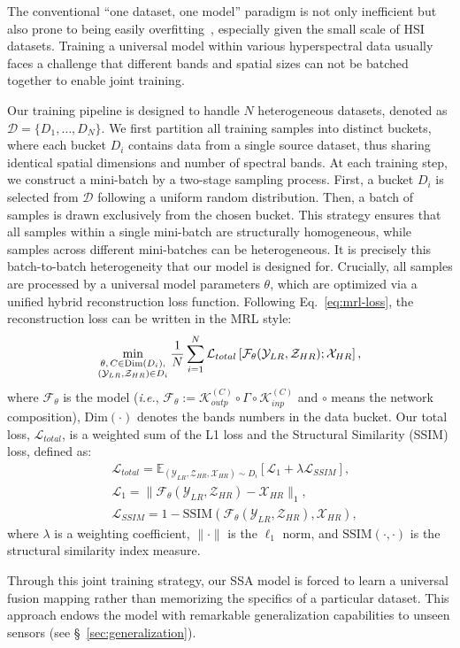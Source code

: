 The conventional ``one dataset, one model'' paradigm is not only inefficient but also prone to being easily overfitting~\cite{yan2025hyperspectral}, especially given the small scale of HSI datasets. Training a universal model within various hyperspectral data usually faces a challenge that different bands and spatial sizes can not be batched together to enable joint training.

Our training pipeline is designed to handle $N$ heterogeneous datasets, denoted as $\mathcal{D} = \{D_1, \dots, D_N\}$.
We first partition all training samples into distinct buckets, where each bucket  $D_i$ contains data from a single source dataset, thus sharing identical spatial dimensions and number of spectral bands. 
At each training step, we construct a mini-batch by a two-stage sampling process. First, a bucket $D_i$ is selected from $\mathcal D$ following a uniform random distribution. Then, a batch of samples is drawn exclusively from the chosen bucket. This strategy ensures that all samples within a single mini-batch are structurally homogeneous, while samples across different mini-batches can be heterogeneous.
It is precisely this batch-to-batch heterogeneity that our model is designed for.
Crucially, all samples are processed by a universal model parameters $\theta$, which are optimized via a unified hybrid reconstruction loss function.
Following Eq.~\eqref{eq:mrl-loss}, the reconstruction loss can be written in the MRL style:
\begin{equation}
    \min_{\substack{\theta,\, C\in \text{Dim}(D_i), \\ (\mathcal{Y}_{LR},\mathcal{Z}_{HR})\in D_i}} \frac 1 N \sum_{i=1}^N  \mathcal L_{total}\left[ \mathcal F_\theta( \mathcal{Y}_{LR},\mathcal{Z}_{HR}); \mathcal{X}_{HR} \right],  \notag 
\end{equation}
where $\mathcal F_\theta$ is the model (\textit{i.e.}, $\mathcal F_\theta:=\mathcal K_{outp}^{(C)} \circ \Gamma \circ \mathcal K_{inp}^{(C)}$ and $\circ$ means the network composition), Dim$(\cdot)$  denotes the bands numbers in the data bucket. Our total loss, $\mathcal{L}_{total}$, is a weighted sum of the L1 loss and the Structural Similarity (SSIM) loss, defined as:
\begin{equation}
\begin{aligned}
    &\mathcal{L}_{total} = \mathbb{E}_{(\mathcal{Y}_{LR}, \mathcal{Z}_{HR}, \mathcal{X}_{HR}) \sim D_{i}} \left[ \mathcal{L}_{1}+ \lambda\mathcal{L}_{SSIM} \right], \\
    &\mathcal{L}_{1} = \| \mathcal{F}_\theta(\mathcal{Y}_{LR}, \mathcal{Z}_{HR})  - \mathcal{X}_{HR} \|_1 ,\\
    &\mathcal{L}_{SSIM} = 1 - \text{SSIM}(\mathcal{F}_\theta(\mathcal{Y}_{LR}, \mathcal{Z}_{HR}), \mathcal{X}_{HR}),
\end{aligned}
\end{equation}
where $\lambda$ is a weighting coefficient, $\| \cdot \|$ is the $\ell_1$ norm, and $\text{SSIM}(\cdot, \cdot)$ is the structural similarity index measure.

Through this joint training strategy, our SSA model is forced to learn a universal fusion mapping rather than memorizing the specifics of a particular dataset.
This approach endows the model with remarkable generalization capabilities to unseen sensors (see \S~\ref{sec:generalization}).
